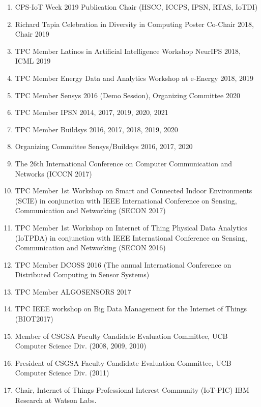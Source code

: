 \documentclass[12pt]{article}
\begin{document}
\begin{enumerate}
    \item CPS-IoT Week 2019 Publication Chair (HSCC, ICCPS, IPSN, RTAS, IoTDI)
    \item Richard Tapia Celebration in Diversity in Computing Poster Co-Chair 2018, Chair 2019
    \item TPC Member Latinos in Artificial Intelligence Workshop NeurIPS 2018, ICML 2019
    \item TPC Member Energy Data and Analytics Workshop at e-Energy 2018, 2019
    \item TPC Member Sensys 2016 (Demo Session), Organizing Committee 2020
    \item TPC Member IPSN 2014, 2017, 2019, 2020, 2021
    \item TPC Member Buildsys 2016, 2017, 2018, 2019, 2020
    \item Organizing Committee Sensys/Buildsys 2016, 2017, 2020
    \item The 26th International Conference on Computer Communication and Networks (ICCCN 2017)
    \item TPC Member 1st Workshop on Smart and Connected Indoor Environments (SCIE) in conjunction with IEEE International Conference on Sensing, Communication and Networking (SECON 2017)
    \item TPC Member 1st Workshop on Internet of Thing Physical Data Analytics (IoTPDA) in conjunction with IEEE International Conference on Sensing, Communication and Networking (SECON 2016)
    \item TPC Member DCOSS 2016 (The annual International Conference on
    Distributed Computing in Sensor Systems)
    \item TPC Member ALGOSENSORS 2017 
    \item TPC IEEE workshop on Big Data Management for the Internet of Things (BIOT2017)
    \item Member of CSGSA Faculty Candidate Evaluation Committee, UCB Computer Science Div. (2008, 2009, 2010)
    \item President of CSGSA Faculty Candidate Evaluation Committee, UCB Computer Science Div. (2011)
    \item Chair, Internet of Things Professional Interest Community (IoT-PIC) IBM Research at Watson Labs.
\end{enumerate}
\end{document}
